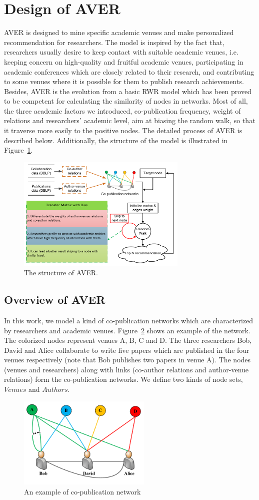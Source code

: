 \documentclass[9pt]{acm_proc_article-sp}
\begin{document}
\section{Design of AVER}
AVER is designed to mine specific academic venues and make personalized recommendation for researchers. The model is inspired by the fact that, researchers usually desire to keep contact with suitable academic venues, i.e. keeping concern on high-quality and fruitful academic venues, participating in academic conferences which are closely related to their research, and contributing to some venues where it is possible for them to publish research achievements. Besides, AVER is the evolution from a basic RWR model which has been proved to be competent for calculating the similarity of nodes in networks. Most of all, the three academic factors we introduced, co-publication frequency, weight of relations and researchers' academic level, aim at biasing the random walk, so that it traverse more easily to the positive nodes. The detailed process of AVER is described below. Additionally, the structure of the model is illustrated in Figure~\ref{Fig1}.
\begin{figure}[!ht]
\centering
\includegraphics [width=3.2in]{Fig1.pdf}
\caption{The structure of AVER.}
\label{Fig1}
\end{figure}
\subsection{Overview of AVER}
In this work, we model a kind of co-publication networks which are characterized by researchers and academic venues. Figure~\ref{Fig2} shows an example of the network. The colorized nodes represent venues A, B, C and D. The three researchers Bob, David and Alice collaborate to write five papers which are published in the four venues respectively (note that Bob publishes two papers in venue A). The nodes (venues and researchers) along with links (co-author relations and author-venue relations) form the co-publication networks. We define two kinds of node sets, $Venues$ and $Authors$.
\begin{figure}[t]
\centering
\includegraphics [width=2.5in]{Fig2.pdf}
\caption{An example of co-publication network}
\label{Fig2}
\end{figure}
\end{document}

